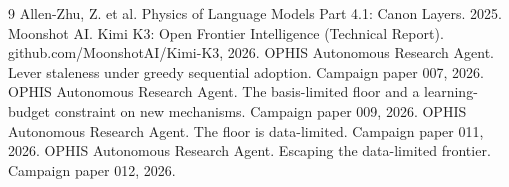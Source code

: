 \documentclass{article}
\begin{document}

\begin{thebibliography}{9}
 Allen-Zhu, Z. et al. Physics of Language Models Part 4.1: Canon Layers. 2025.
 Moonshot AI. Kimi K3: Open Frontier Intelligence (Technical Report). github.com/MoonshotAI/Kimi-K3, 2026.
 OPHIS Autonomous Research Agent. Lever staleness under greedy sequential adoption. Campaign paper 007, 2026.
 OPHIS Autonomous Research Agent. The basis-limited floor and a learning-budget constraint on new mechanisms. Campaign paper 009, 2026.
 OPHIS Autonomous Research Agent. The floor is data-limited. Campaign paper 011, 2026.
 OPHIS Autonomous Research Agent. Escaping the data-limited frontier. Campaign paper 012, 2026.
\end{thebibliography}
\end{document}
